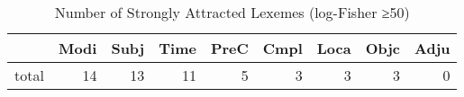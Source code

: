 \begin{table}[htbp!]
\centering
\caption{Number of Strongly Attracted Lexemes (log-Fisher ≥50)}
\label{table:Nstrong}
\begin{tabular}{lrrrrrrrr}
\toprule
{} &  Modi &  Subj &  Time &  PreC &  Cmpl &  Loca &  Objc &  Adju \\
\midrule
total &    14 &    13 &    11 &     5 &     3 &     3 &     3 &     0 \\
\bottomrule
\end{tabular}
\end{table}
